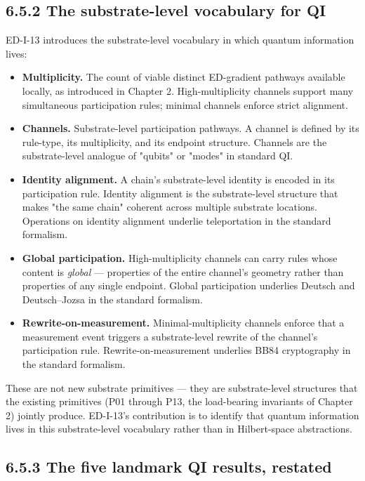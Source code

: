\documentclass[11pt]{book}
\begin{document}
\subsection{6.5.2 The substrate-level vocabulary for QI}

ED-I-13 introduces the substrate-level vocabulary in which quantum information lives:

\begin{itemize}
\item \textbf{Multiplicity.} The count of viable distinct ED-gradient pathways available locally, as introduced in Chapter 2. High-multiplicity channels support many simultaneous participation rules; minimal channels enforce strict alignment.
\item \textbf{Channels.} Substrate-level participation pathways. A channel is defined by its rule-type, its multiplicity, and its endpoint structure. Channels are the substrate-level analogue of "qubits" or "modes" in standard QI.
\item \textbf{Identity alignment.} A chain's substrate-level identity is encoded in its participation rule. Identity alignment is the substrate-level structure that makes "the same chain" coherent across multiple substrate locations. Operations on identity alignment underlie teleportation in the standard formalism.
\item \textbf{Global participation.} High-multiplicity channels can carry rules whose content is \textit{global} — properties of the entire channel's geometry rather than properties of any single endpoint. Global participation underlies Deutsch and Deutsch–Jozsa in the standard formalism.
\item \textbf{Rewrite-on-measurement.} Minimal-multiplicity channels enforce that a measurement event triggers a substrate-level rewrite of the channel's participation rule. Rewrite-on-measurement underlies BB84 cryptography in the standard formalism.
\end{itemize}

These are not new substrate primitives — they are substrate-level structures that the existing primitives (P01 through P13, the load-bearing invariants of Chapter 2) jointly produce. ED-I-13's contribution is to identify that quantum information lives in this substrate-level vocabulary rather than in Hilbert-space abstractions.

\subsection{6.5.3 The five landmark QI results, restated}
\end{document}
